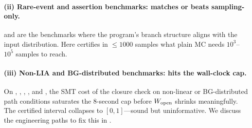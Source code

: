 \paragraph{(ii) Rare-event and assertion benchmarks: \toolname{}
matches or beats sampling-only.}
 and  are the
benchmarks where the program's branch structure aligns with the
input distribution.  Here \toolname{} certifies in $\le 1000$ samples
what plain MC needs $10^3$--$10^5$ samples to reach.

\paragraph{(iii) Non-LIA and BG-distributed benchmarks: \toolname{}
hits the wall-clock cap.}  On
, ,
, , and
, the SMT cost of the closure check on
non-linear or BG-distributed path conditions saturates the $8$-second
cap before $W_{\mathrm{open}}$ shrinks meaningfully.  The certified interval
collapses to $[0,1]$---sound but uninformative.  We discuss the
engineering paths to fix this in .

